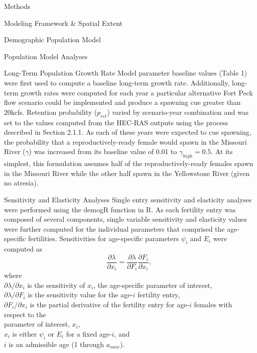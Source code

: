 \documentclass[12pt]{article}
\begin{document}
\begin{section}{Methods}
\begin{subsection}{Modeling Framework \& Spatial Extent}
\begin{subsubsection}{Demographic Population Model}
\end{subsubsection}

\end{subsection}

\begin{subsection}{Population Model Analyses}
\begin{subsubsection}{Long-Term Population Growth Rate}
Model parameter baseline values (Table 1) were first used to compute a baseline long-term growth rate.  Additionally, long-term growth rates were computed for each year a particular alternative Fort Peck flow scenario could be implemented and produce a spawning cue greater than 20kcfs.  Retention probability ($p_{ret}$) varied by scenario-year combination and was set to the values computed from the HEC-RAS outputs using the process described in Section 2.1.1.  As each of these years were expected to cue spawning, the probability that a reproductively-ready female would spawn in the Missouri River ($\gamma$) was increased from its baseline value of 0.01 to $\gamma_{high}=0.5$.  At its simplest, this formulation assumes half of the reproductively-ready females spawn in the Missouri River while the other half spawn in the Yellowstone River (given no atresia).
\end{subsubsection}

\begin{subsubsection}{Sensitivity and Elasticity Analyses} 
Single entry sensitivity and elasticity analyses were performed using the demogR function in R.  As each fertility entry was composed of several components, single variable sensitivity and elasticity values were further computed for the individual parameters that comprised the age-specific fertilities.  Sensitivities for age-specific parameters $\psi_i$ and $E_i$ were computed as
\begin{equation}
\frac{\partial\lambda}{\partial x_i}=\frac{\partial\lambda}{\partial F_i}\frac{\partial F_i}{\partial x_i},
\end{equation} 
where\\
\hspace*{0.5cm}$\partial\lambda/\partial x_i$ is the sensitivity of $x_i$, the age-specific parameter of interest,\\
\hspace*{0.5cm}$\partial\lambda/\partial F_i$ is the sensitivity value for the age-$i$ fertility entry,\\
\hspace*{0.5cm}$\partial F_i/\partial x_i$ is the partial derivative of the fertility entry for age-$i$ females with respect to the\\ 
\hspace*{1.5cm}parameter of interest, $x_i$,\\
\hspace*{0.5cm}$x_i$ is either $\psi_i$ or $E_i$ for a fixed age-$i$, and\\
\hspace*{0.5cm}$i$ is an admissible age (1 through $a_{max}$).\\
 

\end{subsubsection}
\end{subsection}
\end{section}
\end{document}

